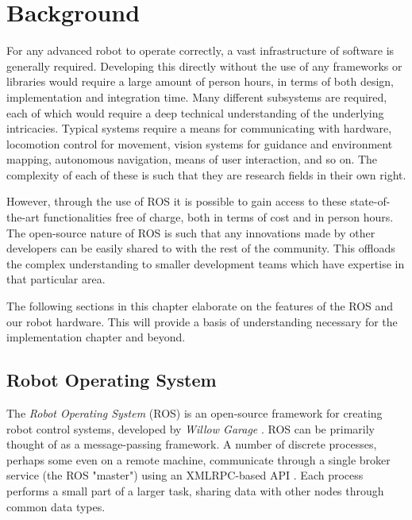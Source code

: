 \chapter{Background}
\label{chap:background}

For any advanced robot to operate correctly, a vast infrastructure of software is generally required. Developing this directly without the use of any frameworks or libraries would require a large amount of person hours, in terms of both design, implementation and integration time. Many different subsystems are required, each of which would require a deep technical understanding of the underlying intricacies. Typical systems require a means for communicating with hardware, locomotion control for movement, vision systems for guidance and environment mapping, autonomous navigation, means of user interaction, and so on. The complexity of each of these is such that they are research fields in their own right. 

However, through the use of ROS it is possible to gain access to these state-of-the-art functionalities free of charge, both in terms of cost and in person hours. The open-source nature of ROS is such that any innovations made by other developers can be easily shared to with the rest of the community. This offloads the complex understanding to smaller development teams which have expertise in that particular area.

The following sections in this chapter elaborate on the features of the ROS and our robot hardware. This will provide a basis of understanding necessary for the implementation chapter and beyond.


\section{Robot Operating System}

The \emph{Robot Operating System} (ROS) is an open-source framework for creating robot control systems, developed by \emph{Willow Garage} \cite{ros_paper}. ROS can be primarily thought of as a message-passing framework. A number of discrete processes, perhaps some even on a remote machine, communicate through a single broker service (the ROS "master") using an XMLRPC-based API \cite{ros_paper}. Each process performs a small part of a larger task, sharing data with other nodes through common data types.

